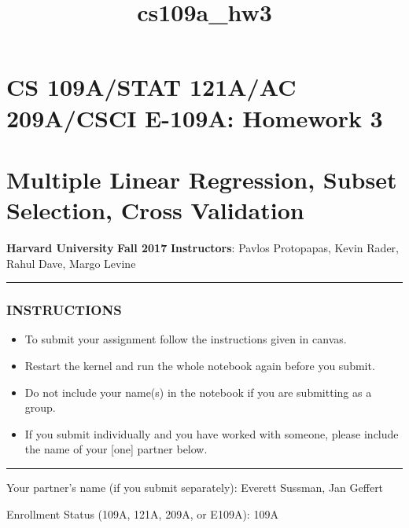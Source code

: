 \documentclass[11pt]{article}
\title{cs109a\_hw3}
\providecommand{\tightlist}{%
      \setlength{\itemsep}{0pt}\setlength{\parskip}{0pt}}
\begin{document}
    
    
    \maketitle
    
    

    
    \section{CS 109A/STAT 121A/AC 209A/CSCI E-109A: Homework
3}\label{cs-109astat-121aac-209acsci-e-109a-homework-3}

\section{Multiple Linear Regression, Subset Selection, Cross
Validation}\label{multiple-linear-regression-subset-selection-cross-validation}

\textbf{Harvard University} \textbf{Fall 2017} \textbf{Instructors}:
Pavlos Protopapas, Kevin Rader, Rahul Dave, Margo Levine

\begin{center}\rule{0.5\linewidth}{\linethickness}\end{center}

\subsubsection{INSTRUCTIONS}\label{instructions}

\begin{itemize}
\tightlist
\item
  To submit your assignment follow the instructions given in canvas.
\item
  Restart the kernel and run the whole notebook again before you submit.
\item
  Do not include your name(s) in the notebook if you are submitting as a
  group.
\item
  If you submit individually and you have worked with someone, please
  include the name of your {[}one{]} partner below.
\end{itemize}

\begin{center}\rule{0.5\linewidth}{\linethickness}\end{center}

    Your partner's name (if you submit separately): Everett Sussman, Jan
Geffert

Enrollment Status (109A, 121A, 209A, or E109A): 109A
\end{document}
